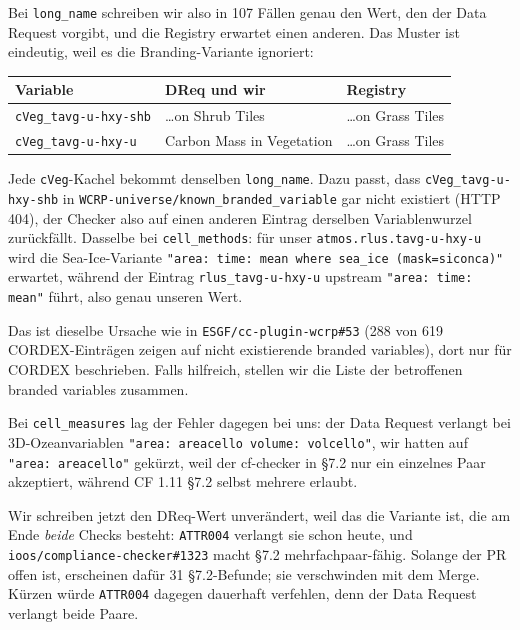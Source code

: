 \documentclass[11pt,a4paper]{article}
\newcommand{\code}[1]{\texttt{\small #1}}
\begin{document}
Bei \code{long\_name} schreiben wir also in 107 F\"allen genau den Wert, den der
Data Request vorgibt, und die Registry erwartet einen anderen. Das Muster ist
eindeutig, weil es die Branding-Variante ignoriert:

\begin{center}
\begin{tabular}{lll}
\toprule
\textbf{Variable} & \textbf{DReq und wir} & \textbf{Registry} \\
\midrule
\code{cVeg\_tavg-u-hxy-shb} & \dots on Shrub Tiles & \dots on Grass Tiles \\
\code{cVeg\_tavg-u-hxy-u}   & Carbon Mass in Vegetation & \dots on Grass Tiles \\
\bottomrule
\end{tabular}
\end{center}

Jede \code{cVeg}-Kachel bekommt denselben \code{long\_name}. Dazu passt, dass
\code{cVeg\_tavg-u-hxy-shb} in \code{WCRP-universe/known\_branded\_variable} gar
nicht existiert (HTTP 404), der Checker also auf einen anderen Eintrag derselben
Variablenwurzel zur\"uckf\"allt. Dasselbe bei \code{cell\_methods}: f\"ur unser
\code{atmos.rlus.tavg-u-hxy-u} wird die Sea-Ice-Variante
\code{"area: time: mean where sea\_ice (mask=siconca)"} erwartet, w\"ahrend der
Eintrag \code{rlus\_tavg-u-hxy-u} upstream \code{"area: time: mean"} f\"uhrt, also
genau unseren Wert.

Das ist dieselbe Ursache wie in \code{ESGF/cc-plugin-wcrp\#53} (288 von 619
CORDEX-Eintr\"agen zeigen auf nicht existierende branded variables), dort nur f\"ur
CORDEX beschrieben. Falls hilfreich, stellen wir die Liste der betroffenen
branded variables zusammen.

Bei \code{cell\_measures} lag der Fehler dagegen bei uns: der Data Request
verlangt bei 3D-Ozeanvariablen \code{"area: areacello volume: volcello"}, wir
hatten auf \code{"area: areacello"} gek\"urzt, weil der cf-checker in \S7.2 nur ein
einzelnes Paar akzeptiert, w\"ahrend CF 1.11 \S7.2 selbst mehrere erlaubt.

Wir schreiben jetzt den DReq-Wert unver\"andert, weil das die Variante ist, die am
Ende \emph{beide} Checks besteht: \code{ATTR004} verlangt sie schon heute, und
\code{ioos/compliance-checker\#1323} macht \S7.2 mehrfachpaar-f\"ahig. Solange
der PR offen ist, erscheinen daf\"ur 31 \S7.2-Befunde; sie verschwinden mit dem
Merge. K\"urzen w\"urde \code{ATTR004} dagegen dauerhaft verfehlen, denn der Data
Request verlangt beide Paare.
\end{document}
